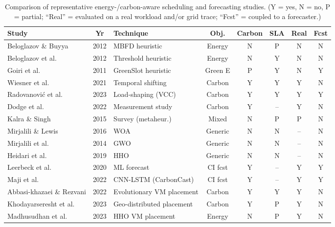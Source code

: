 \documentclass[12pt,a4paper]{article}
\begin{document}
\begin{table}[H]\centering
\footnotesize
\setlength{\tabcolsep}{3.5pt}
\caption{Comparison of representative energy-/carbon-aware scheduling and forecasting studies.
(Y = yes, N = no, P = partial; ``Real'' = evaluated on a real workload and/or grid trace; ``Fcst'' = coupled to a forecaster.)}
\label{tab:related}
\begin{tabular}{@{}p{2.35cm}cp{1.9cm}ccccc@{}}
\toprule
Study & Yr & Technique & Obj. & Carbon & SLA & Real & Fcst \\
\midrule
Beloglazov \& Buyya \cite{beloglazov2012optimal} & 2012 & MBFD heuristic & Energy & N & P & N & N \\
Beloglazov et al. \cite{beloglazov2012energy} & 2012 & Threshold heuristic & Energy & N & Y & N & N \\
Goiri et al. \cite{goiri2011greenslot} & 2011 & GreenSlot heuristic & Green E & P & Y & N & Y \\
Wiesner et al. \cite{wiesner2021lets} & 2021 & Temporal shifting & Carbon & Y & Y & Y & N \\
Radovanovi\'c et al. \cite{radovanovic2023carbon} & 2023 & Load-shaping (VCC) & Carbon & Y & Y & Y & Y \\
Dodge et al. \cite{dodge2022measuring} & 2022 & Measurement study & Carbon & Y & -- & Y & N \\
Kalra \& Singh \cite{kalra2015review} & 2015 & Survey (metaheur.) & Mixed & N & P & P & N \\
Mirjalili \& Lewis \cite{mirjalili2016whale} & 2016 & WOA & Generic & N & N & -- & N \\
Mirjalili et al. \cite{mirjalili2014grey} & 2014 & GWO & Generic & N & N & -- & N \\
Heidari et al. \cite{heidari2019harris} & 2019 & HHO & Generic & N & N & -- & N \\
Leerbeck et al. \cite{leerbeck2020short} & 2020 & ML forecast & CI fcst & Y & -- & Y & Y \\
Maji et al. \cite{maji2022carboncast} & 2022 & CNN-LSTM (CarbonCast) & CI fcst & Y & -- & Y & Y \\
Abbasi-khazaei \& Rezvani \cite{abbasikhazaei2022energy} & 2022 & Evolutionary VM placement & Carbon & Y & Y & Y & N \\
Khodayarseresht et al. \cite{khodayarseresht2023energy} & 2023 & Geo-distributed placement & Carbon & Y & P & Y & N \\
Madhusudhan et al. \cite{madhusudhan2023hho} & 2023 & HHO VM placement & Energy & N & P & Y & N \\

\end{tabular}
\end{table}
\end{document}
